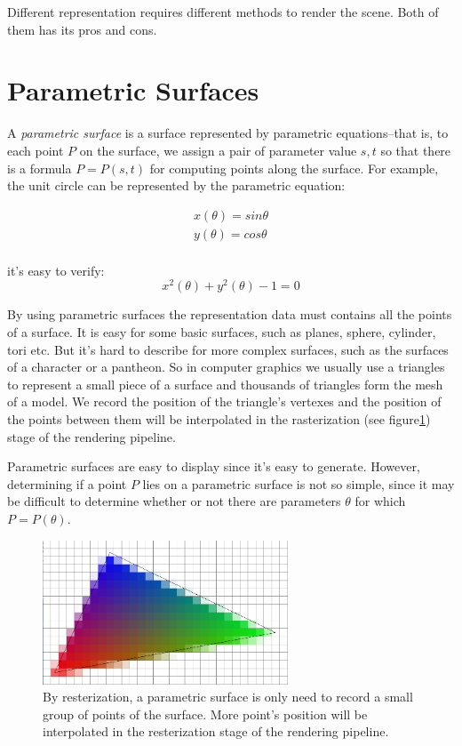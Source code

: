 Different representation requires different methods to render the scene. Both of them has its pros and cons. 

\section{Parametric Surfaces}
A \textit{parametric surface} is a surface represented by parametric equations--that is, to each point $P$ on the surface, we assign a pair of parameter value $s,t$ so that there is a formula $P=P(s,t)$ for computing points along the surface. For example, the unit circle can be represented by the parametric equation:

\begin{equation*}
	\begin{aligned}
		x(\theta)=sin\theta \\
		y(\theta)=cos\theta\\
	\end{aligned}
\end{equation*}

it's easy to verify:
\begin{equation*}
	x^2(\theta)+y^2(\theta)-1=0
\end{equation*}

By using parametric surfaces the representation data must contains all the points of a surface. It is easy for some basic surfaces, such as planes, sphere, cylinder, tori etc. But it's hard to describe for more complex surfaces, such as the surfaces of a character or a pantheon. So in computer graphics we usually use a triangles to represent a small piece of a surface and thousands of triangles form the mesh of a model. We record the position of the triangle's vertexes and the position of the points between them will be interpolated in the rasterization (see figure\ref{f:resterization}) stage of the rendering pipeline. 

Parametric surfaces are easy to display since it's easy to generate. However, determining if a point $P$ lies on a parametric surface is not so simple, since it may be difficult to determine whether or not there are parameters $\theta$ for which $P=P(\theta)$. 

\begin{figure}
\sidecaption
	\includegraphics[width=0.65\textwidth]{graphics/df/rasterization}
	\caption{By resterization, a parametric surface is only need to record a small group of points of the surface. More point's position will be interpolated in the resterization stage of the rendering pipeline.}
	\label{f:resterization}
\end{figure}

